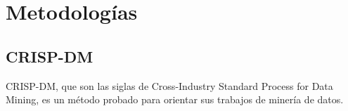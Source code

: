\part{Metodolog\'ias}

\chapter{CRISP-DM}
CRISP-DM, que son las siglas de Cross-Industry Standard Process for Data Mining, es un m\'etodo probado para orientar sus trabajos de miner\'ia de datos. 